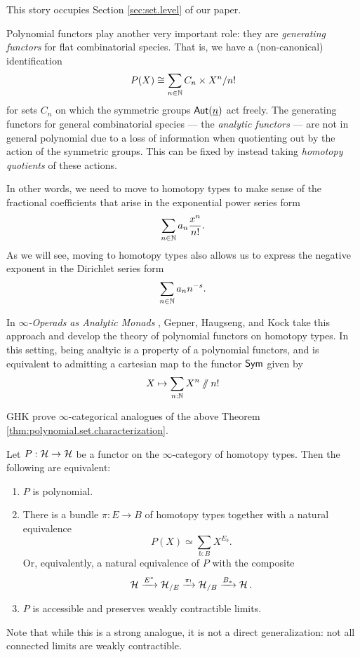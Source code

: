 This story occupies Section \ref{sec:set.level} of our paper.

Polynomial functors play another very important role: they are \emph{generating
  functors} for flat combinatorial species. That is, we have a (non-canonical)
identification
$$P(X) \cong \sum_{n \in \operatorname{\mathbb{N}}} C_n \times X^n/n!$$
for sets $C_n$ on which the symmetric groups $\operatorname{\mathsf{Aut}}(\underline{n})$ act freely.
The generating functors for general combinatorial species --- the \emph{analytic
functors} --- are not in general polynomial due to a loss of information when
quotienting out by the action of the symmetric groups. This can be fixed by
instead taking \emph{homotopy quotients} of these actions.

In other words, we need to move to homotopy types to make sense of the
fractional coefficients that arise in the exponential power series form
$$\sum_{n \in \operatorname{\mathbb{N}}} a_n \frac{x^n}{n!}.$$
As we will see, moving to homotopy types also allows us to express the negative
exponent in the Dirichlet series form
$$\sum_{n \in \operatorname{\mathbb{N}}} a_n n^{-s}.$$

In \emph{$\infty$-Operads as Analytic Monads} \cite{GHK:Analytic.Monads},
Gepner, Haugseng, and Kock take this approach and develop the theory of
polynomial functors on homotopy types. In this setting, being analtyic is a
property of a polynomial functors, and is equivalent to admitting a cartesian
map to the functor $\mathsf{{Sym}}$ given by
$$X \mapsto \sum_{n : \operatorname{\mathbb{N}}} X^n \mathbin{/\mkern-6mu/} n!$$

GHK prove $\infty$-categorical analogues of the above Theorem
\ref{thm:polynomial.set.characterization}.
\begin{thm}\label{thm:polynomial.type.characterization}
Let $P : \operatorname{\mathcal{H}} \to \operatorname{\mathcal{H}}$ be a functor on the $\infty$-category of homotopy types.
Then the following are equivalent:
  \begin{enumerate}
  \item $P$ is polynomial.
  \item There is a bundle $\pi : E \to B$ of homotopy types together with a natural equivalence
    $$P(X) \simeq \sum_{b : B} X^{E_b}.$$
    Or, equivalently, a natural equivalence of $P$ with the composite
    $$\operatorname{\mathcal{H}} \xrightarrow{E^{\ast}} \operatorname{\mathcal{H}}_{/E} \xrightarrow{\pi_!} \operatorname{\mathcal{H}}_{/B} \xrightarrow{B_\ast} \operatorname{\mathcal{H}}.$$
  \item $P$ is accessible and preserves weakly contractible limits.
  \end{enumerate}
\end{thm}

Note that while this is a strong analogue, it is not a direct generalization:
not all connected limits are weakly contractible.

